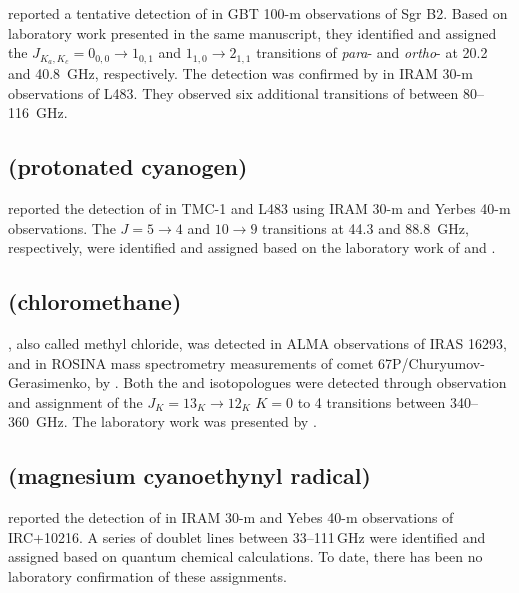 \documentclass[twocolumn]{aastex631}
\newcommand{\update}[1]{{#1}}
\begin{document}
	\citet{Gupta:2013ky} reported a tentative detection of  in GBT 100-m observations of Sgr B2.  Based on laboratory work presented in the same manuscript, they identified and assigned the $J_{K_a,K_c} = 0_{0,0}\rightarrow1_{0,1}$ and $1_{1,0}\rightarrow2_{1,1}$ transitions of \emph{para}- and \emph{ortho}- at 20.2 and 40.8~GHz, respectively.  The detection was confirmed by \citet{Marcelino:2018cp} in IRAM 30-m observations of L483.  They observed six additional transitions of  between 80--116~GHz.
	
	\subsection{ (protonated cyanogen)}
	\label{NCCNH+}
	
	\citet{Agundez:2015ko} reported the detection of  in TMC-1 and L483 using IRAM 30-m and Yerbes 40-m observations.  The $J = 5\rightarrow4$ and $10\rightarrow9$ transitions at 44.3 and 88.8~GHz, respectively, were identified and assigned based on the laboratory work of \citet{Amano:1991jr} and \citet{Gottlieb:2000nc}.
	
	\subsection{ (chloromethane)}
	\label{CH3Cl}
	
	, also called methyl chloride, was detected in ALMA observations of IRAS 16293, and in ROSINA mass spectrometry measurements of comet 67P/Churyumov-Gerasimenko, by \citet{Fayolle:2017bg}.  Both the  and  isotopologues were detected through observation and assignment of the $J_K = 13_K\rightarrow12_K$ $K = 0$ to 4 transitions between 340--360~GHz.  The laboratory work was presented by \citet{Wlodarczak:1986bj}.
	
	\subsection{\update{ (magnesium cyanoethynyl radical)}}
	\label{MgC3N}
	
	\update{\citet{Cernicharo:2019ga} reported the detection of \ce{MgC3N} in IRAM 30-m and Yebes 40-m observations of IRC+10216.  A series of doublet lines between 33--111\,GHz were identified and assigned based on quantum chemical calculations.  To date, there has been no laboratory confirmation of these assignments.}
	
\end{document}
